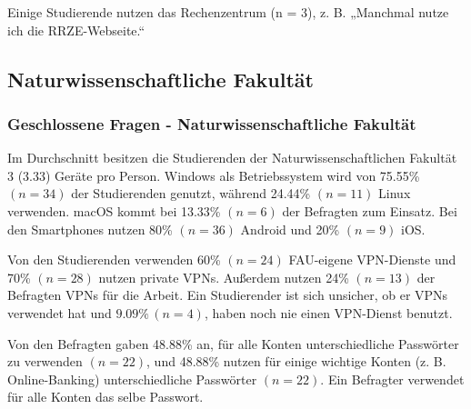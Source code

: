 \documentclass[german,report]{i1thesis}
\begin{document}
Einige Studierende nutzen das Rechenzentrum (n = 3), z. B. „Manchmal nutze ich die RRZE-Webseite.“

\subsection{Naturwissenschaftliche Fakultät}

\subsubsection{Geschlossene Fragen - Naturwissenschaftliche Fakultät}

Im Durchschnitt besitzen die Studierenden der Naturwissenschaftlichen Fakultät 3 (3.33) Geräte pro Person. Windows als Betriebssystem wird von 75.55\% \((n = 34)\) der Studierenden genutzt, während 24.44\% \((n = 11)\) Linux verwenden. macOS kommt bei 13.33\% \((n = 6)\) der Befragten zum Einsatz. Bei den Smartphones nutzen 80\% \((n = 36)\) Android und 20\% \((n = 9)\) iOS.

Von den Studierenden verwenden 60\% \((n=24)\) FAU-eigene VPN-Dienste und 70\% \((n=28)\) nutzen private VPNs. Außerdem nutzen 24\% \((n=13)\) der Befragten VPNs für die Arbeit. Ein Studierender ist sich unsicher, ob er VPNs verwendet hat und \(9.09\% \,(n = 4)\), haben noch nie einen VPN-Dienst benutzt.

Von den Befragten gaben 48.88\% an, für alle Konten unterschiedliche Passwörter zu verwenden \((n=22)\), und 48.88\% nutzen für einige wichtige Konten (z. B. Online-Banking) unterschiedliche Passwörter \((n=22)\). Ein Befragter verwendet für alle Konten das selbe Passwort.
\end{document}
